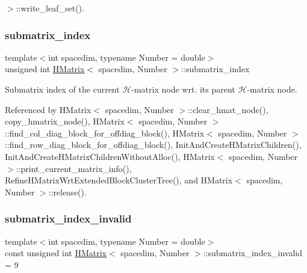 $>$\+::write\+\_\+leaf\+\_\+set().

\mbox{\label{classHMatrix_a64c851dd63ba1a466c19f451be369475}} 
\subsubsection{\texorpdfstring{submatrix\+\_\+index}{submatrix\_index}}
{\footnotesize\ttfamily template$<$int spacedim, typename Number = double$>$ \\
unsigned int \hyperlink{classHMatrix}{H\+Matrix}$<$ spacedim, Number $>$\+::submatrix\+\_\+index\hspace{0.3cm}{\ttfamily [private]}}

Submatrix index of the current $\mathcal{H}$-\/matrix node wrt. its parent $\mathcal{H}$-\/matrix node. 

Referenced by H\+Matrix$<$ spacedim, Number $>$\+::clear\+\_\+hmat\+\_\+node(), copy\+\_\+hmatrix\+\_\+node(), H\+Matrix$<$ spacedim, Number $>$\+::find\+\_\+col\+\_\+diag\+\_\+block\+\_\+for\+\_\+offdiag\+\_\+block(), H\+Matrix$<$ spacedim, Number $>$\+::find\+\_\+row\+\_\+diag\+\_\+block\+\_\+for\+\_\+offdiag\+\_\+block(), Init\+And\+Create\+H\+Matrix\+Children(), Init\+And\+Create\+H\+Matrix\+Children\+Without\+Alloc(), H\+Matrix$<$ spacedim, Number $>$\+::print\+\_\+current\+\_\+matrix\+\_\+info(), Refine\+H\+Matrix\+Wrt\+Extended\+Block\+Cluster\+Tree(), and H\+Matrix$<$ spacedim, Number $>$\+::release().

\mbox{\label{classHMatrix_a8b5a9fb65c716187d95bcdb43542884c}} 
\subsubsection{\texorpdfstring{submatrix\+\_\+index\+\_\+invalid}{submatrix\_index\_invalid}}
{\footnotesize\ttfamily template$<$int spacedim, typename Number = double$>$ \\
const unsigned int \hyperlink{classHMatrix}{H\+Matrix}$<$ spacedim, Number $>$\+::submatrix\+\_\+index\+\_\+invalid = 9\hspace{0.3cm}{\ttfamily [static]}}


